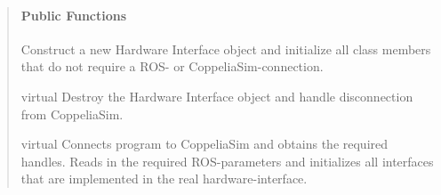 \documentclass[letterpaper,10pt,english]{sphinxmanual}
\begin{document}
\begin{quote}
\begin{fulllineitems}
\paragraph{Public Functions}

\begin{fulllineitems}
\label{\detokenize{HardwareInterface:_CPPv2N21coppeliasim_interface17HardwareInterface17HardwareInterfaceEv}}%
\pysigstartmultiline
{}\label{\detokenize{HardwareInterface:project0classcoppeliasim__interface_1_1HardwareInterface_1a731c52969b54a2cdda78a494bcd878ee}}%
\pysigstopmultiline
Construct a new Hardware Interface object and initialize all class members that do not require a ROS- or CoppeliaSim-connection. 

\end{fulllineitems}


\begin{fulllineitems}
\label{\detokenize{HardwareInterface:_CPPv2N21coppeliasim_interface17HardwareInterfaceD0Ev}}%
\pysigstartmultiline
virtual \label{\detokenize{HardwareInterface:project0classcoppeliasim__interface_1_1HardwareInterface_1a61047459c300ddd92e0b2d82e3b7c2e2}}%
\pysigstopmultiline
Destroy the Hardware Interface object and handle disconnection from CoppeliaSim. 

\end{fulllineitems}


\begin{fulllineitems}
\label{\detokenize{HardwareInterface:_CPPv2N21coppeliasim_interface17HardwareInterface4initERN3ros10NodeHandleERN3ros10NodeHandleE}}%
\pysigstartmultiline
virtual \label{\detokenize{HardwareInterface:project0classcoppeliasim__interface_1_1HardwareInterface_1ada54343beeb383c43951877e3d49cf8e}}%
\pysigstopmultiline
Connects program to CoppeliaSim and obtains the required handles. Reads in the required ROS-parameters and initializes all interfaces that are implemented in the real hardware-interface. 


\end{fulllineitems}
\end{fulllineitems}
\end{quote}
\end{document}
